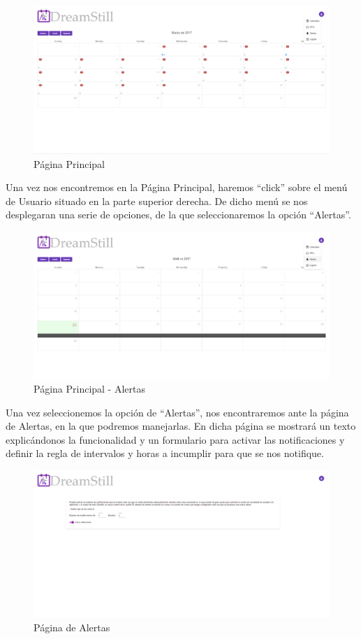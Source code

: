 \documentclass[11pt,openany]{book}
\begin{document}
\begin{figure}[H]
\centering
\includegraphics[totalheight=7cm]{manualUsuario/paginaPrincipal.png}
\caption{Página Principal}
\end{figure}

Una vez nos encontremos en la Página Principal, haremos ``click'' sobre el menú de Usuario situado en la parte superior derecha. De dicho menú se nos desplegaran una serie de opciones, de la que seleccionaremos la opción ``Alertas''.

\begin{figure}[H]
\centering
\includegraphics[totalheight=7cm]{manualUsuario/alertas.png}
\caption{Página Principal - Alertas}
\end{figure}

Una vez seleccionemos la opción de ``Alertas'', nos encontraremos ante la página de Alertas, en la que podremos manejarlas. En dicha página se mostrará un texto explicándonos la funcionalidad y un formulario para activar las notificaciones y definir la regla de intervalos y horas a incumplir para que se nos notifique.

\begin{figure}[H]
\centering
\includegraphics[totalheight=7cm]{manualUsuario/paginaAlertas.png}
\caption{Página de Alertas}
\end{figure}
\end{document}

